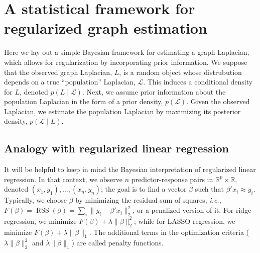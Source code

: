 \documentclass[12pt]{article}
\newcommand{\reals}{\mathbb{R}}
\DeclareMathOperator*{\RSS}{RSS}
\theoremstyle{plain}
\begin{document}


\section{A statistical framework for regularized graph estimation}
\label{snx:framework}

Here we lay out a simple Bayesian framework for estimating a graph
Laplacian, which allows for regularization by incorporating prior
information.  We suppose that the observed graph Laplacian, $L$, is a
random object whose distrubution depends on a true ``population''
Laplacian, $\mathcal{L}$.  This induces a conditional density for $L$,
denoted $p(L \mid \mathcal{L})$.  Next, we assume prior information
about the population Laplacian in the form of a prior density,
$p(\mathcal{L})$.  Given the observed Laplacian, we estimate the
population Laplacian by maximizing its posterior density,
$p(\mathcal{L} \mid L)$.


\subsection{Analogy with regularized linear regression}
\label{S:regression}

It will be helpful to keep in mind the Bayesian interpretation of 
regularized linear regression.  
In that context, we observe $n$ predictor-response pairs in 
$\reals^p \times \reals$, denoted $(x_1, y_1), \dotsc, (x_n, y_n)$; 
the goal is to find a vector $\beta$ such that $\beta' x_i \approx y_i$.  
Typically, we choose $\beta$ by minimizing the residual sum of squares,
\emph{i.e.}, $F(\beta)=\RSS(\beta) = \sum_i \| y_i - \beta' x_i \|_2^2$, or 
a penalized version of it.  
For ridge regression, we minimize $F(\beta) + \lambda \|\beta\|_2^2$; while 
for LASSO regression, we minimize $F(\beta) + \lambda \|\beta\|_1$.  
The additional terms in the optimization criteria ($\lambda \|\beta\|_2^2$ 
and $\lambda \|\beta\|_1$) are called penalty functions.
\end{document}
